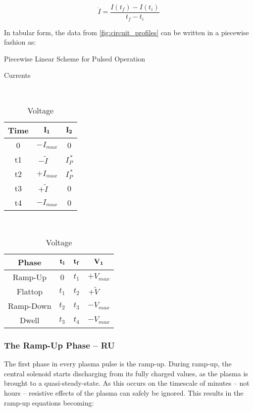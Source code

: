 \begin{equation}
	\dot I = \frac{ I(t_f) - I(t_i) }{t_f - t_i}
\end{equation}

In tabular form, the data from \cref{fig:circuit_profiles} can be written in a piecewise fashion as:

\begin{table}[h!]
\centering	
\caption{Piecewise Linear Scheme for Pulsed Operation}
\hfill
\begin{subtable}[t]{0.4\textwidth}
\centering	
\caption{Currents} ~\\
\begin{tabular}{ c|c|c } 

\textbf{Time} & {$\bold{I_1}$} & {$\bold{I_2}$} \\
\hline
0 & $-I_{max}$ & 0 \\ 
t1 & $-\tilde I \ \ \ \,\, $ & $I_P^{\,*} $ \\ 
t2 & $+I_{max}$ & $I_P^{\,*}$ \\ 
t3 & $+\tilde I \ \ \ \,\, $ & 0 \\ 
t4 & $-I_{max}$ & 0 \\ 
\end{tabular}
\end{subtable}
\hfill
\begin{subtable}[t]{0.5\textwidth}
\centering	
\caption{Voltage} ~\\
\begin{tabular}{ c|c|c|c } 
\textbf{Phase} & $\bold{t_i}$ & $\bold{t_f}$ & $\bold{V_1}$ \\
\hline
Ramp-Up & 0 & $t_1$ & $+V_{max}$ \\ 
Flattop & $t_1$ & $t_2$ & $+ \tilde V$ \ \,\,\, \\ 
Ramp-Down & $t_2$ & $t_3$ & ${-V}_{max}$ \\ 
Dwell & $t_3$ & $t_4$ & ${-V}_{max}$ \\ 
\end{tabular}
\end{subtable}
\hfill
\hfill
\end{table}

\subsubsection{The Ramp-Up Phase -- RU}

The first phase in every plasma pulse is the ramp-up. During ramp-up, the central solenoid starts discharging from its fully charged values, as the plasma is brought to a quasi-steady-state. As this occurs on the timescale of minutes -- not hours -- resistive effects of the plasma can safely be ignored. This results in the ramp-up equations becoming:

